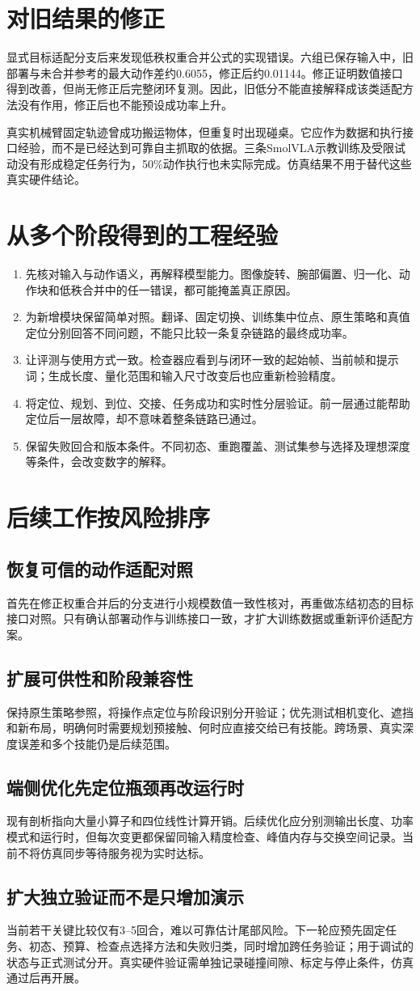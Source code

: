 \section{对旧结果的修正}
显式目标适配分支后来发现低秩权重合并公式的实现错误。六组已保存输入中，旧部署与未合并参考的最大动作差约0.6055，修正后约0.01144。修正证明数值接口得到改善，但尚无修正后完整闭环复测。因此，旧低分不能直接解释成该类适配方法没有作用，修正后也不能预设成功率上升。

真实机械臂固定轨迹曾成功搬运物体，但重复时出现碰桌。它应作为数据和执行接口经验，而不是已经达到可靠自主抓取的依据。三条SmolVLA示教训练及受限试动没有形成稳定任务行为，50\%动作执行也未实际完成。仿真结果不用于替代这些真实硬件结论。
\section{从多个阶段得到的工程经验}
\begin{enumerate}
\item 先核对输入与动作语义，再解释模型能力。图像旋转、腕部偏置、归一化、动作块和低秩合并中的任一错误，都可能掩盖真正原因。
\item 为新增模块保留简单对照。翻译、固定切换、训练集中位点、原生策略和真值定位分别回答不同问题，不能只比较一条复杂链路的最终成功率。
\item 让评测与使用方式一致。检查器应看到与闭环一致的起始帧、当前帧和提示词；生成长度、量化范围和输入尺寸改变后也应重新检验精度。
\item 将定位、规划、到位、交接、任务成功和实时性分层验证。前一层通过能帮助定位后一层故障，却不意味着整条链路已通过。
\item 保留失败回合和版本条件。不同初态、重跑覆盖、测试集参与选择及理想深度等条件，会改变数字的解释。
\end{enumerate}
\section{后续工作按风险排序}
\subsection{恢复可信的动作适配对照}
首先在修正权重合并后的分支进行小规模数值一致性核对，再重做冻结初态的目标接口对照。只有确认部署动作与训练接口一致，才扩大训练数据或重新评价适配方案。
\subsection{扩展可供性和阶段兼容性}
保持原生策略参照，将操作点定位与阶段识别分开验证；优先测试相机变化、遮挡和新布局，明确何时需要规划预接触、何时应直接交给已有技能。跨场景、真实深度误差和多个技能仍是后续范围。
\subsection{端侧优化先定位瓶颈再改运行时}
现有剖析指向大量小算子和四位线性计算开销。后续优化应分别测输出长度、功率模式和运行时，但每次变更都保留同输入精度检查、峰值内存与交换空间记录。当前不将仿真同步等待服务视为实时达标。
\subsection{扩大独立验证而不是只增加演示}
当前若干关键比较仅有3--5回合，难以可靠估计尾部风险。下一轮应预先固定任务、初态、预算、检查点选择方法和失败归类，同时增加跨任务验证；用于调试的状态与正式测试分开。真实硬件验证需单独记录碰撞间隙、标定与停止条件，仿真通过后再开展。
